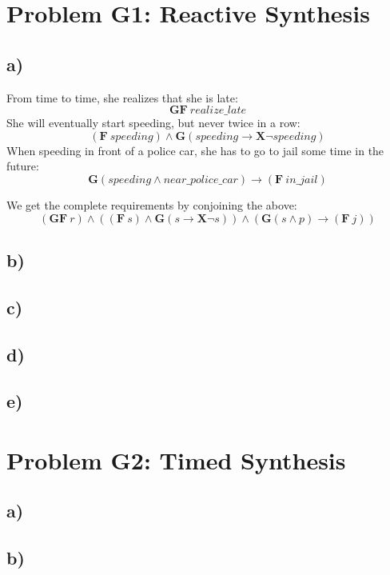 \documentclass[12pt]{article}
\begin{document}
\lstset{language=C++}


\section*{Problem G1: Reactive Synthesis}
\subsection*{a)}
From time to time, she realizes that she is late:
\[ \mathbf{GF} \: realize\_late \]
She will eventually start speeding, but never twice in a row:
\[ (\mathbf{F} \: speeding) \land \mathbf{G}(speeding \rightarrow \mathbf{X} \neg speeding) \]
When speeding in front of a police car, she has to go to jail some time in the future:
\[ \mathbf{G}(speeding \land near\_police\_car) \rightarrow (\mathbf{F} \: in\_jail) \]

We get the complete requirements by conjoining the above:
\[ (\mathbf{GF} \: r) \land ((\mathbf{F} \: s) \land \mathbf{G}(s \rightarrow \mathbf{X} \neg s)) \land (\mathbf{G}(s \land p) \rightarrow (\mathbf{F} \: j)) \]
\subsection*{b)}

\subsection*{c)}

\subsection*{d)}

\subsection*{e)}

\section*{Problem G2: Timed Synthesis}
\subsection*{a)}

\subsection*{b)}
\end{document}
